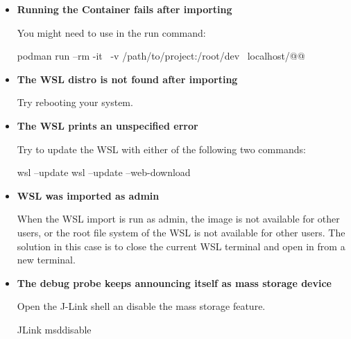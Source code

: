 \begin{itemize}
  \item {\bf Running the Container fails after importing}

    You might need to use  in the run command:
  \begin{monobox}
podman run --rm -it \
-v /path/to/project:/root/dev \
localhost/@\imagename{}@
\end{monobox}
  \item {\bf The WSL distro is not found after importing}

    Try rebooting your system.
  \item {\bf The WSL prints an unspecified error}

    Try to update the WSL with either of the following two commands:
  \begin{monobox}
wsl --update
wsl --update --web-download
\end{monobox}
  \item \textbf{WSL was imported as admin}

    When the WSL import is run as admin, the image is not available for other users, or the root file system of the WSL is not available for other users.
    The solution in this case is to close the current WSL terminal and open in from a new terminal.
  \item {\bf The debug probe keeps announcing itself as mass storage device}

    Open the J-Link shell an disable the mass storage feature.
  \begin{monobox}
JLink
msddisable
\end{monobox}
\end{itemize}
